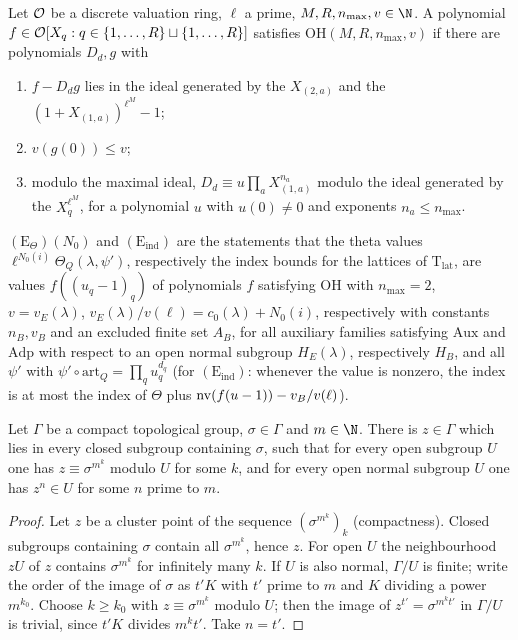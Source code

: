 \begin{definition}\label{pf:baselat1:def:ordhyp}
Let $\mathcal O$ be a discrete valuation ring, $\ell$ a prime, $M,R,n_{\max},v\in\N$. A polynomial
$f\in\mathcal O[X_q:q\in\{1,\dots,R\}\sqcup\{1,\dots,R\}]$ satisfies $\mathrm{OH}(M,R,n_{\max},v)$ if there are
polynomials $D_d,g$ with
\begin{enumerate}[label=(\roman*)]
\item $f-D_dg$ lies in the ideal generated by the $X_{(2,a)}$ and the $(1+X_{(1,a)})^{\ell^M}-1$;
\item $v(g(0))\le v$;
\item modulo the maximal ideal, $D_d\equiv u\prod_aX_{(1,a)}^{n_a}$ modulo the ideal generated by the
  $X_q^{\ell^M}$, for a polynomial $u$ with $u(0)\ne0$ and exponents $n_a\le n_{\max}$.
\end{enumerate}
$(\mathrm{E}_{\Theta})(N_0)$ and $(\mathrm{E}_{\mathrm{ind}})$ are the statements that the theta values $\ell^{N_0(i)}\Theta_Q(\lambda,\psi')$,
respectively the index bounds for the lattices of $\mathrm{T}_{\mathrm{lat}}$, are values $f((u_q-1)_q)$ of polynomials $f$
satisfying $\mathrm{OH}$ with $n_{\max}=2$, $v=v_E(\lambda)$, $v_E(\lambda)/v(\ell)=c_0(\lambda)+N_0(i)$,
respectively with constants $n_B,v_B$ and an excluded finite set $A_B$, for all auxiliary families satisfying
$\mathrm{Aux}$ and $\mathrm{Adp}$ with respect to an open normal subgroup $H_E(\lambda)$, respectively $H_B$,
and all $\psi'$ with $\psi'\circ\mathrm{art}_Q=\prod_qu_q^{d_q}$ (for $(\mathrm{E}_{\mathrm{ind}})$: whenever the value is nonzero, the
index is at most the index of $\Theta$ plus $\operatorname{nv}(f(u-1))-v_B/v(\ell)$).
\end{definition}

\begin{lemma}\label{pf:baselat1:limitpow}
Let $\Gamma$ be a compact topological group, $\sigma\in\Gamma$ and $m\in\N$. There is $z\in\Gamma$ which lies in every
closed subgroup containing $\sigma$, such that for every open subgroup $U$ one has $z\equiv\sigma^{m^k}$ modulo $U$
for some $k$, and for every open normal subgroup $U$ one has $z^n\in U$ for some $n$ prime to $m$.
\end{lemma}

\begin{proof}
Let $z$ be a cluster point of the sequence $(\sigma^{m^k})_k$ (compactness). Closed subgroups containing $\sigma$ contain
all $\sigma^{m^k}$, hence $z$. For open $U$ the neighbourhood $zU$ of $z$ contains $\sigma^{m^k}$ for infinitely many
$k$. If $U$ is also normal, $\Gamma/U$ is finite; write the order of the image of $\sigma$ as $t'K$ with $t'$ prime to
$m$ and $K$ dividing a power $m^{k_0}$. Choose $k\ge k_0$ with $z\equiv\sigma^{m^k}$ modulo $U$; then the image of
$z^{t'}=\sigma^{m^kt'}$ in $\Gamma/U$ is trivial, since $t'K$ divides $m^kt'$. Take $n=t'$.
\end{proof}

